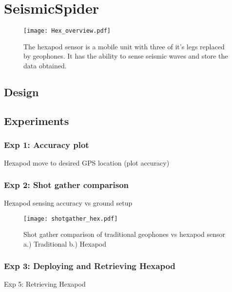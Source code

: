 \section{SeismicSpider}\label{sec:SeismicSpider}
\begin{figure} \centering
  {\texttt{[image: Hex\_overview.pdf]}}
 \caption{The hexapod sensor is a mobile unit with three of it's legs replaced by geophones. It has the ability to sense seismic waves and store the data obtained.} 
 \label{fig:TradvsAutoDrop}
\end{figure}
\subsection{Design}

\subsection{Experiments}
\subsubsection{Exp 1: Accuracy plot}
Hexapod move to desired GPS location  (plot accuracy)\\
\subsubsection{Exp 2: Shot gather comparison}
Hexapod sensing accuracy vs ground setup\\
\begin{figure} \centering
  {\texttt{[image: shotgather\_hex.pdf]}}
 \caption{Shot gather comparison of traditional geophones vs hexapod sensor a.) Traditional b.) Hexapod} 
 \label{fig:TradvsAutoDrop}
\end{figure}
\subsubsection{Exp 3: Deploying and Retrieving Hexapod}
Exp 5: Retrieving Hexapod\\